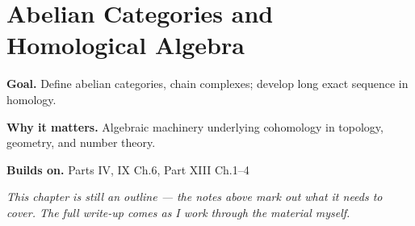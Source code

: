 \chapter{Abelian Categories and Homological Algebra}
\label{ch:13-category-theory-and-universal-structures-08}

\begin{chapterintro}
\textbf{Goal.} Define abelian categories, chain complexes; develop long exact sequence in homology.

\textbf{Why it matters.} Algebraic machinery underlying cohomology in topology, geometry, and number theory.

\textbf{Builds on.} Parts IV, IX Ch.6, Part XIII Ch.1–4
\end{chapterintro}

\textit{This chapter is still an outline --- the notes above mark out what it needs to cover. The full write-up comes as I work through the material myself.}
